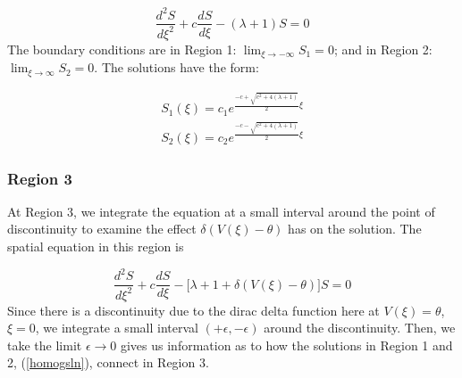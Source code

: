 \documentclass[12pt]{article}
\begin{document}
\begin{equation}
\frac{d^2S}{d\xi^2} + c\frac{dS}{d\xi} - (\lambda + 1)S = 0
\end{equation} 
The boundary conditions are in Region 1: $\lim_{\xi \to -\infty}S_1 = 0$; and in Region 2: $\lim_{\xi \to \infty}S_2 = 0$. The solutions have the form:

\begin{equation} \label{homogsln}
\begin{aligned}
S_1(\xi) = c_1e^{\frac{-c+\sqrt{c^2+4(\lambda+1)}}{2}\xi} \\
S_2(\xi) = c_2e^{\frac{-c-\sqrt{c^2+4(\lambda+1)}}{2}\xi} 
\end{aligned}
\end{equation}

\subsubsection{Region 3}
At Region 3, we integrate the equation at a small interval around the point of discontinuity to examine the effect $\delta(V(\xi)-\theta)$ has on the solution. The spatial equation in this region is 

\begin{equation}
\frac{d^2S}{d\xi^2} + c\frac{dS}{d\xi} - \big[\lambda + 1 + \delta(V(\xi)-\theta)\big]S = 0
\end{equation} 
Since there is a discontinuity due to the dirac delta function here at $V(\xi) = \theta$, $\xi = 0$, we integrate a small interval $(+\epsilon,-\epsilon)$ around the discontinuity. Then, we take the limit $\epsilon \to 0$ gives us information as to how the solutions in Region 1 and 2, (\ref{homogsln}), connect in Region 3.
\end{document}
